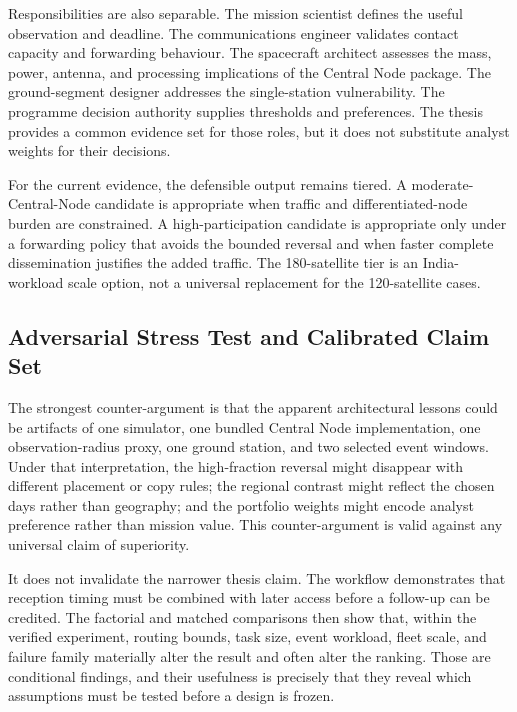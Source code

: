 Responsibilities are also separable. The mission scientist defines the useful observation and deadline. The communications engineer validates contact capacity and forwarding behaviour. The spacecraft architect assesses the mass, power, antenna, and processing implications of the Central Node package. The ground-segment designer addresses the single-station vulnerability. The programme decision authority supplies thresholds and preferences. The thesis provides a common evidence set for those roles, but it does not substitute analyst weights for their decisions.

For the current evidence, the defensible output remains tiered. A moderate-Central-Node candidate is appropriate when traffic and differentiated-node burden are constrained. A high-participation candidate is appropriate only under a forwarding policy that avoids the bounded reversal and when faster complete dissemination justifies the added traffic. The 180-satellite tier is an India-workload scale option, not a universal replacement for the 120-satellite cases.

\clearpage
\subsection{Adversarial Stress Test and Calibrated Claim Set}
\label{sec:adversarial_claims}

The strongest counter-argument is that the apparent architectural lessons could be artifacts of one simulator, one bundled Central Node implementation, one observation-radius proxy, one ground station, and two selected event windows. Under that interpretation, the high-fraction reversal might disappear with different placement or copy rules; the regional contrast might reflect the chosen days rather than geography; and the portfolio weights might encode analyst preference rather than mission value. This counter-argument is valid against any universal claim of superiority.

It does not invalidate the narrower thesis claim. The workflow demonstrates that reception timing must be combined with later access before a follow-up can be credited. The factorial and matched comparisons then show that, within the verified experiment, routing bounds, task size, event workload, fleet scale, and failure family materially alter the result and often alter the ranking. Those are conditional findings, and their usefulness is precisely that they reveal which assumptions must be tested before a design is frozen.

